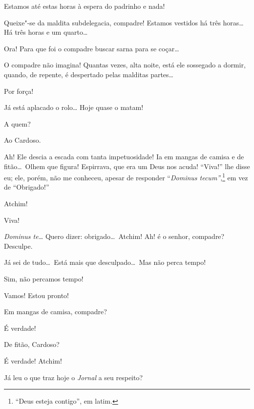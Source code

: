  Estamos até estas horas à espera do padrinho e nada!

 Queixe"-se da maldita subdelegacia, compadre! Estamos vestidos
há três horas\ldots\  Há três horas e um quarto\ldots

 Ora! Para que foi o compadre buscar sarna para se coçar\ldots

 O compadre não imagina! Quantas vezes, alta noite, está ele
sossegado a dormir, quando, de
repente, é despertado pelas malditas partes\ldots

 Por força!

  Já está aplacado o rolo\ldots
{} Hoje quase o matam!

  A quem?

 Ao Cardoso.

 Ah! Ele descia a escada com tanta impetuosidade! Ia em mangas
de camisa e de fitão\ldots\ Olhem que
figura! Espirrava, que era um Deus nos acuda! “Viva!” lhe disse eu; ele,
porém, não me conheceu, apesar de
responder ``\textit{Dominus tecum”},\footnote{ “Deus esteja contigo”, em latim.}
em vez de ``Obrigado!”



  Atchim!

 Viva!

 \textit{Dominus te\ldots} Quero dizer: obrigado\ldots\ Atchim! Ah! é o
senhor, compadre? Desculpe.

 Já sei de tudo\ldots\ Está mais que desculpado\ldots\ Mas não perca
tempo!

 Sim, não percamos tempo!

 Vamos!  Estou pronto!

 Em mangas de camisa, compadre?

 É verdade! 

 De fitão, Cardoso?

 É verdade!  Atchim!

 Já leu o que traz hoje o \textit{Jornal} a seu respeito?

